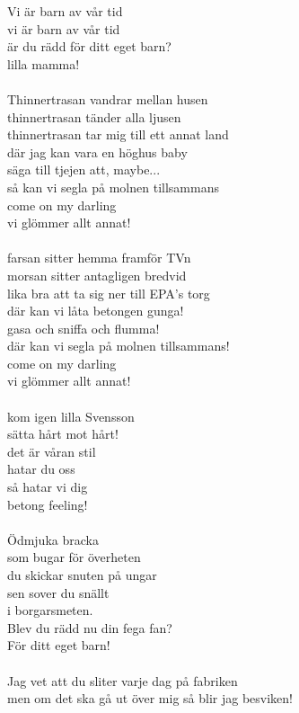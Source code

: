 Vi är barn av vår tid\\
vi är barn av vår tid\\
är du rädd för ditt eget barn?\\
lilla mamma!\\
\\
Thinnertrasan vandrar mellan husen\\
thinnertrasan tänder alla ljusen\\
thinnertrasan tar mig till ett annat land\\
där jag kan vara en höghus baby\\
säga till tjejen att, maybe...\\
så kan vi segla på molnen tillsammans\\
come on my darling\\
vi glömmer allt annat!\\
\\
farsan sitter hemma framför TVn\\
morsan sitter antagligen bredvid\\
lika bra att ta sig ner till EPA's torg\\
där kan vi låta betongen gunga!\\
gasa och sniffa och flumma!\\
där kan vi segla på molnen tillsammans!\\
come on my darling\\
vi glömmer allt annat!\\
\\
kom igen lilla Svensson\\
sätta hårt mot hårt!\\
det är våran stil\\
hatar du oss\\
så hatar vi dig\\
betong feeling!\\
\\
Ödmjuka bracka\\
som bugar för överheten\\
du skickar snuten på ungar\\
sen sover du snällt\\
i borgarsmeten.\\
Blev du rädd nu din fega fan?\\
För ditt eget barn!\\
\\
Jag vet att du sliter varje dag på fabriken\\
men om det ska gå ut över mig så blir jag besviken!\\
